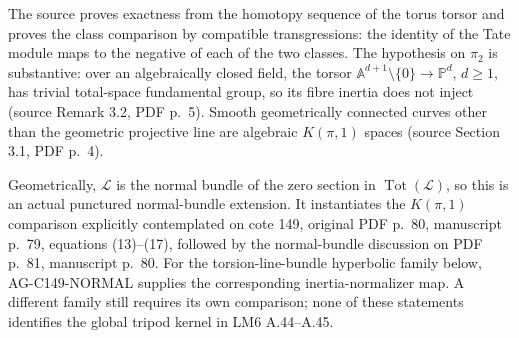 The source proves exactness from the homotopy sequence of the torus
torsor and proves the class comparison by compatible transgressions:
the identity of the Tate module maps to the negative of each of the
two classes. The hypothesis on $\pi_2$ is substantive: over an
algebraically closed field, the torsor
$\mathbb A^{d+1}\setminus\{0\}\to\mathbb P^d$, $d\ge1$, has trivial
total-space fundamental group, so its fibre inertia does not inject
(source Remark 3.2, PDF p.~5). Smooth geometrically connected curves
other than the geometric projective line are algebraic $K(\pi,1)$
spaces (source Section 3.1, PDF p.~4).

Geometrically, $\mathcal L$ is the normal bundle of the zero section in
$\operatorname{Tot}(\mathcal L)$, so this is an actual punctured
normal-bundle extension. It instantiates the $K(\pi,1)$ comparison
explicitly contemplated on cote 149, original PDF p.~80, manuscript
p.~79, equations (13)--(17), followed by the normal-bundle discussion
on PDF p.~81, manuscript p.~80. For the torsion-line-bundle hyperbolic family below,
AG-C149-NORMAL supplies the corresponding inertia-normalizer map.
A different family still requires its own comparison; none of these
statements identifies the global tripod kernel in LM6 A.44--A.45.


